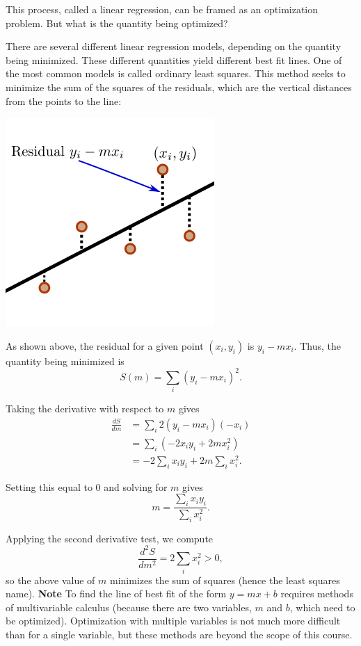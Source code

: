 \documentclass[twoside,openright,titlepage,a4paper]{book}
\begin{document}
\begin{sloppypar}
This process, called a linear regression, can be framed as an optimization problem. But what is the quantity being optimized?

There are several different linear regression models, depending on the quantity being minimized. These different quantities yield different best fit lines. One of the most common models is called ordinary least squares. This method seeks to minimize the sum of the squares of the residuals, which are the vertical distances from the points to the line:
\begin{center}\includegraphics[scale=0.6]{Residuals}\end{center}

As shown above, the residual for a given point $(x_i,y_i)$ is $y_i - mx_i$. Thus, the quantity being minimized is \[ S(m) = \sum_i (y_i - mx_i)^2. \]

Taking the derivative with respect to $m$ gives
\begin{align*} 
\frac{dS}{dm} &= \sum_i 2(y_i - mx_i)(-x_i) \\
&= \sum_i \left(-2x_iy_i + 2mx_i^2 \right) \\
&= -2 \sum_i x_i y_i + 2m \sum_i x_i^2.
\end{align*}

Setting this equal to 0 and solving for $m$ gives \[ m = \frac{\displaystyle \sum_i x_i y_i}{\displaystyle \sum_i x_i^2}. \]

Applying the second derivative test, we compute \[ \frac{d^2S}{dm^2} = 2 \sum_i x^2_i > 0, \] so the above value of $m$ minimizes the sum of squares (hence the least squares name).
\bigbreak
\textbf{Note} To find the line of best fit of the form $y = mx+b$ requires methods of multivariable calculus (because there are two variables, $m$ and $b$, which need to be optimized). Optimization with multiple variables is not much more difficult than for a single variable, but these methods are beyond the scope of this course.


\end{sloppypar}
\end{document}

